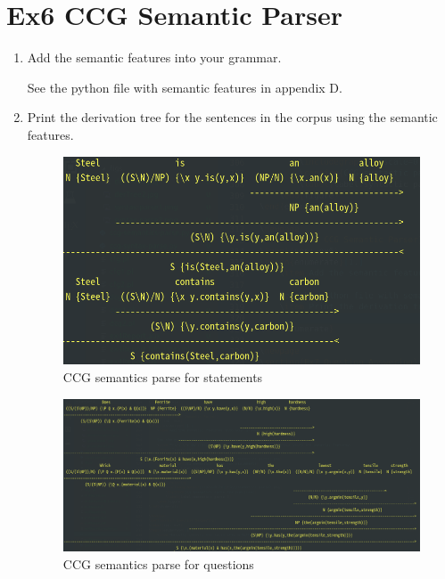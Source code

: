 \documentclass[12pt]{article}
\begin{document}
{\newpage
\section{Ex6 CCG Semantic Parser}
\label{sec: ex6}
\begin{enumerate}[1.]
    \item Add the semantic features into your grammar.
    
    See the python file with semantic features in appendix D.
    \item Print the derivation tree for the sentences in the corpus using the semantic features.
    \begin{figure}[ht]
        \centering
        \includegraphics[scale=0.35]{figs/semantics-parse1.png}
        \caption{CCG semantics parse for statements}
        \label{label:semantics parse 1}
    \end{figure}
    \begin{figure}[ht]
        \centering
        \includegraphics[scale=0.24]{figs/semantics-parse2.png}
        \caption{CCG semantics parse for questions}
        \label{label:semantics parse 2}
    \end{figure}
\end{enumerate}

}
\end{document}
